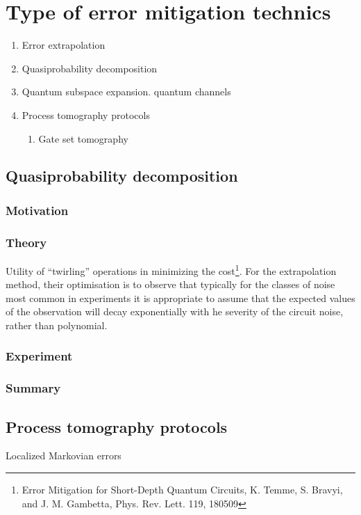 \documentclass[11pt, oneside]{article}   	%
\begin{document}
\section{Type of error mitigation technics}
\begin{enumerate}
\item Error extrapolation
\item Quasiprobability decomposition
\item Quantum subspace expansion. quantum channels
\item Process tomography protocols
\begin{enumerate}
\item Gate set tomography
\end{enumerate}
\end{enumerate}

\subsection{Quasiprobability decomposition}
\subsubsection{Motivation}
\subsubsection{Theory}
Utility of ``twirling'' operations in minimizing the cost\footnote{Error Mitigation for Short-Depth Quantum Circuits, K. Temme, S. Bravyi, and J. M. Gambetta, Phys. Rev. Lett. 119, 180509}.
For the extrapolation method, their optimisation is to observe that typically for the classes of noise most common in experiments it is appropriate to assume that the expected values of the observation will decay exponentially with he severity of the circuit noise, rather than polynomial.

\subsubsection{Experiment}
\subsubsection{Summary}

\subsection{Process tomography protocols}
Localized Markovian errors
\end{document}
